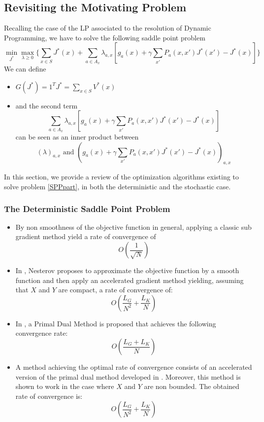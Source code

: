 \documentclass[12pt,reqno]{amsart}
\numberwithin{equation}{section}
\begin{document}
\subsection{Revisiting the Motivating Problem}
Recalling the case of the LP associated to the resolution of Dynamic Programming, we have to solve the following saddle point problem
$$
\min_{J^{*}}\max_{\lambda \geq 0}\{ \sum_{x \in S} J^{*}(x) + \sum_{a \in A_x} \lambda_{a,x}[g_a(x) + \gamma \sum_{x'} P_a(x,x')J^{*}(x') - J^{*}(x)] \}
$$
We can define
\begin{itemize}
\item $G(J^{*}) = 1^{T}J^{*} = \sum_{x \in S} V^{*}(x)$
\item and the second term
$$
\sum_{a \in A_x} \lambda_{a,x}[g_a(x) + \gamma \sum_{x'} P_a(x,x')J^{*}(x') - J^{*}(x)]
$$
can be seen as an inner product between
$$(\lambda)_{a,x} \text{ and } (g_a(x) + \gamma \sum_{x'} P_a(x,x')J^{*}(x') - J^{*}(x))_{a,x}$$
\end{itemize}

In this section, we provide a review of the optimization algorithms existing to solve problem \ref{SPPpart}, in both the deterministic and the stochastic case.

\subsubsection{The Deterministic Saddle Point Problem} \label{sec:deterministic_spp}
\begin{itemize}

\item By non smoothness of the objective function in general, applying a classic sub gradient method \cite{YudinNemirovski} yield a rate of convergence of
$$
O(\dfrac{1}{\sqrt{N}})
$$

\item In \cite{Nesterov}, Nesterov proposes to approximate the objective function by a smooth function and then apply an accelerated gradient method yielding, assuming that $X$ and $Y$ are compact, a rate of convergence of:
$$
O(\dfrac{L_{G}}{N^2} + \dfrac{L_{K}}{N})
$$

\item In \cite{ChambollePock}, a Primal Dual Method is proposed that achieves the following convergence rate:
$$
O(\dfrac{L_{G} + L_{K}}{N})
$$
\item A method achieving the optimal rate of convergence consists of an accelerated version of the primal dual method developed in \cite{ChenLanOuyang}.
Moreover, this method is shown to work in the case where $X$ and $Y$ are non bounded.
The obtained rate of convergence is:
$$
O(\dfrac{L_{G}}{N^2} + \dfrac{L_{K}}{N})
$$
\end{itemize}
\end{document}
